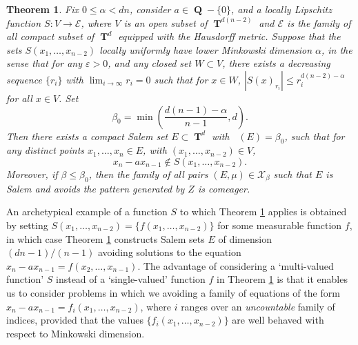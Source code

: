 \documentclass[dvipsnames,letterpaper,12pt]{article}
\numberwithin{equation}{section}
\DeclareMathOperator{\fordim}{\dim_{\mathbf{F}}}
\DeclareMathOperator{\QQ}{\mathbf{Q}}
\DeclareMathOperator{\TT}{\mathbf{T}}
\newtheorem{theorem}{Theorem}
\numberwithin{theorem}{section}
\begin{document}
\begin{theorem} \label{thirdTheorem}
    Fix $0 \leq \alpha < dn$, consider $a \in \QQ - \{ 0 \}$, and a locally Lipschitz function $S: V \to \mathcal{E}$, where $V$ is an open subset of $\TT^{d(n-2)}$ and $\mathcal{E}$ is the family of all compact subset of $\TT^d$ equipped with the Hausdorff metric. Suppose that the sets $S(x_1,\dots,x_{n-2})$ \emph{locally uniformly} have lower Minkowski dimension $\alpha$, in the sense that for any $\varepsilon > 0$, and any closed set $W \subset V$, there exists a decreasing sequence $\{ r_i \}$ with $\lim_{i \to \infty} r_i = 0$ such that for $x \in W$, $|S(x)_{r_i}| \leq r_i^{d(n-2)-\alpha}$ for all $x \in V$. Set
    \[ \beta_0 = \min \left( \frac{d(n-1) - \alpha}{n-1}, d \right). \]
    Then there exists a compact Salem set $E \subset \TT^d$ with $\fordim(E) = \beta_0$, such that for any distinct points $x_1,\dots,x_n \in E$, with $(x_1,\dots,x_{n-2}) \in V$,
    \[ x_n - a x_{n-1} \not \in S(x_1,\dots,x_{n-2}). \]
    Moreover, if $\beta \leq \beta_0$, then the family of all pairs $(E,\mu) \in \mathcal{X}_\beta$ such that $E$ is Salem and avoids the pattern generated by $Z$ is comeager.
\end{theorem}

An archetypical example of a function $S$ to which Theorem \ref{thirdTheorem} applies is obtained by setting $S(x_1,\dots,x_{n-2}) = \{ f(x_1,\dots,x_{n-2}) \}$ for some measurable function $f$, in which case Theorem \ref{thirdTheorem} constructs Salem sets $E$ of dimension $(dn-1)/(n-1)$ avoiding solutions to the equation $x_n - a x_{n-1} = f(x_2,\dots,x_{n-1})$. The advantage of considering a `multi-valued function' $S$ instead of a `single-valued' function $f$ in Theorem \ref{thirdTheorem} is that it enables us to consider problems in which we avoiding a family of equations of the form $x_n - ax_{n-1} = f_i(x_1,\dots,x_{n-2})$, where $i$ ranges over an \emph{uncountable} family of indices, provided that the values $\{ f_i(x_1,\dots,x_{n-2}) \}$ are well behaved with respect to Minkowski dimension.
\end{document}
